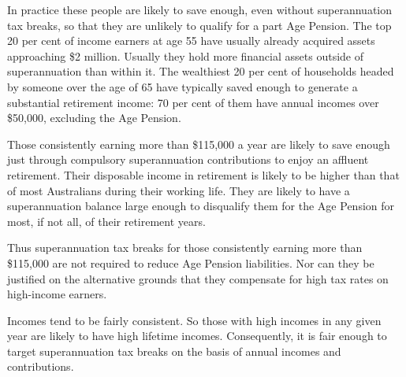 \documentclass{grattanAlpha}
\begin{document}
In practice these people are likely to save enough, even without superannuation tax breaks, so that they are unlikely to qualify for a part Age Pension. The top 20 per cent of income earners at age 55 have usually already acquired assets approaching \$2 million. Usually they hold more financial assets outside of superannuation than within it. The wealthiest 20 per cent of households headed by someone over the age of 65 have typically saved enough to generate a substantial retirement income: 70 per cent of them have annual incomes over \$50,000, excluding the Age Pension.

Those consistently earning more than \$115,000 a year are likely to save enough just through compulsory superannuation contributions to enjoy an affluent retirement. Their disposable income in retirement is likely to be higher than that of most Australians during their working life. They are likely to have a superannuation balance large enough to disqualify them for the Age Pension for most, if not all, of their retirement years. 

Thus superannuation tax breaks for those consistently earning more than \$115,000 are not required to reduce Age Pension liabilities. Nor can they be justified on the alternative grounds that they compensate for high tax rates on high-income earners.

Incomes tend to be fairly consistent. So those with high incomes in any given year are likely to have high lifetime incomes. Consequently, it is fair enough to target superannuation tax breaks on the basis of annual incomes and contributions.
\end{document}
